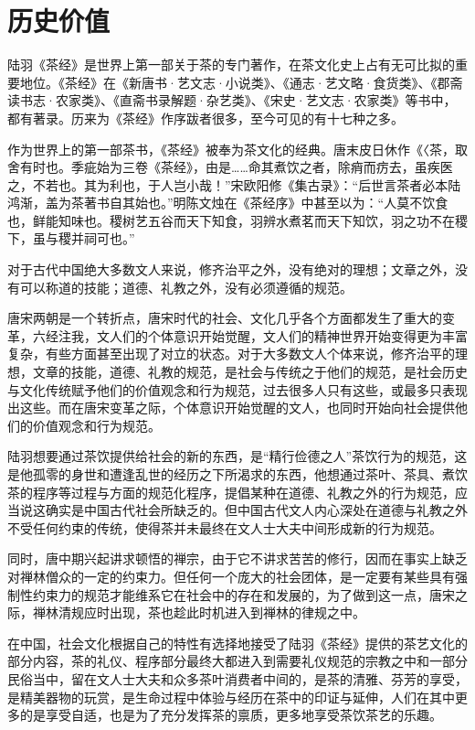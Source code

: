 \documentclass[12pt,UTF8]{ctexbook}
\begin{document}
\section{历史价值}

陆羽《茶经》是世界上第一部关于茶的专门著作，在茶文化史上占有无可比拟的重要地位。《茶经》在《新唐书·艺文志·小说类》、《通志·艺文略·食货类》、《郡斋读书志·农家类》、《直斋书录解题·杂艺类》、《宋史·艺文志·农家类》等书中，都有著录。历来为《茶经》作序跋者很多，至今可见的有十七种之多。

作为世界上的第一部茶书，《茶经》被奉为茶文化的经典。唐末皮日休作《〈茶，取舍有时也。季疵始为三卷《茶经》，由是……命其煮饮之者，除痟而疠去，虽疾医之，不若也。其为利也，于人岂小哉！”宋欧阳修《集古录》：“后世言茶者必本陆鸿渐，盖为茶著书自其始也。”明陈文烛在《茶经序》中甚至以为：“人莫不饮食也，鲜能知味也。稷树艺五谷而天下知食，羽辨水煮茗而天下知饮，羽之功不在稷下，虽与稷并祠可也。”

对于古代中国绝大多数文人来说，修齐治平之外，没有绝对的理想；文章之外，没有可以称道的技能；道德、礼教之外，没有必须遵循的规范。

唐宋两朝是一个转折点，唐宋时代的社会、文化几乎各个方面都发生了重大的变革，六经注我，文人们的个体意识开始觉醒，文人们的精神世界开始变得更为丰富复杂，有些方面甚至出现了对立的状态。对于大多数文人个体来说，修齐治平的理想，文章的技能，道德、礼教的规范，是社会与传统之于他们的规范，是社会历史与文化传统赋予他们的价值观念和行为规范，过去很多人只有这些，或最多只表现出这些。而在唐宋变革之际，个体意识开始觉醒的文人，也同时开始向社会提供他们的价值观念和行为规范。

陆羽想要通过茶饮提供给社会的新的东西，是“精行俭德之人”茶饮行为的规范，这是他孤零的身世和遭逢乱世的经历之下所渴求的东西，他想通过茶叶、茶具、煮饮茶的程序等过程与方面的规范化程序，提倡某种在道德、礼教之外的行为规范，应当说这确实是中国古代社会所缺乏的。但中国古代文人内心深处在道德与礼教之外不受任何约束的传统，使得茶并未最终在文人士大夫中间形成新的行为规范。

同时，唐中期兴起讲求顿悟的禅宗，由于它不讲求苦苦的修行，因而在事实上缺乏对禅林僧众的一定的约束力。但任何一个庞大的社会团体，是一定要有某些具有强制性约束力的规范才能维系它在社会中的存在和发展的，为了做到这一点，唐宋之际，禅林清规应时出现，茶也趁此时机进入到禅林的律规之中。

在中国，社会文化根据自己的特性有选择地接受了陆羽《茶经》提供的茶艺文化的部分内容，茶的礼仪、程序部分最终大都进入到需要礼仪规范的宗教之中和一部分民俗当中，留在文人士大夫和众多茶叶消费者中间的，是茶的清雅、芬芳的享受，是精美器物的玩赏，是生命过程中体验与经历在茶中的印证与延伸，人们在其中更多的是享受自适，也是为了充分发挥茶的禀质，更多地享受茶饮茶艺的乐趣。
\end{document}

